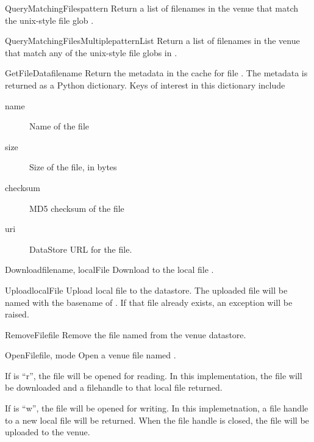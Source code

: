 \documentclass{howto}
\begin{document}
\begin{methoddesc}{QueryMatchingFiles}{pattern}
Return a list of filenames in the venue that match the unix-style file
glob .

\end{methoddesc}

\begin{methoddesc}{QueryMatchingFilesMultiple}{patternList}
Return a list of filenames in the venue that match any of the unix-style file
globs in .

\end{methoddesc}

\begin{methoddesc}{GetFileData}{filename}
Return the metadata in the cache for file . The metadata
is returned as a Python dictionary. Keys of
interest in this dictionary include 
\begin{description}
\item[name~] Name of the file
\item[size~] Size of the file, in bytes
\item[checksum~] MD5 checksum of the file
\item[uri~] DataStore URL for the file.
\end{description}

\end{methoddesc}

\begin{methoddesc}{Download}{filename, localFile}
Download  to the local file .
\end{methoddesc}

\begin{methoddesc}{Upload}{localFile}
Upload local file  to the datastore. The uploaded file will
be named with the basename of . If that file already
exists, an exception will be raised.
\end{methoddesc}

\begin{methoddesc}{RemoveFile}{file}
Remove the file named  from the venue datastore.

\end{methoddesc}

\begin{methoddesc}{OpenFile}{file, mode}
Open a venue file named . 

If  is ``r'', the file
will be opened for reading. In this implementation, the file will be
downloaded and a filehandle to that local file returned. 

If  is ``w'', the file will be opened for writing. In this
implemetnation, a file handle to a new local file will be
returned. When the file handle is closed, the file will be uploaded to
the venue.

\end{methoddesc}
\end{document}
